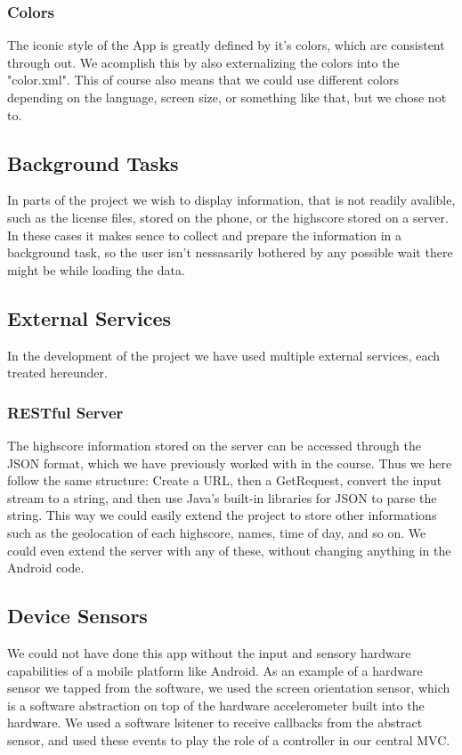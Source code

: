 \documentclass[a4paper, 12pt]{article}
\begin{document}
\subsubsection{Colors}
The iconic style of the App is greatly defined by it's colors, which are consistent through out. We acomplish this by also externalizing the colors into the "color.xml". This of course also means that we could use different colors depending on the language, screen size, or something like that, but we chose not to.

\subsection{Background Tasks}
In parts of the project we wish to display information, that is not
readily avalible, such as the license files, stored on the phone, or
the highscore stored on a server. In these cases it makes sence to
collect and prepare the information in a background task, so the user
isn't nessasarily bothered by any possible wait there might be while
loading the data.

\subsection{External Services}
In the development of the project we have used multiple external
services, each treated hereunder.

\subsubsection{RESTful Server}
The highscore information stored on the server can be accessed through
the JSON format, which we have previously worked with in the
course. Thus we here follow the same structure: Create a URL, then a
GetRequest, convert the input stream to a string, and then use Java's
built-in libraries for JSON to parse the string. This way we could
easily extend the project to store other informations such as the
geolocation of each highscore, names, time of day, and so on. We could
even extend the server with any of these, without changing anything in
the Android code.


\subsection{Device Sensors}
We could not have done this app without the input and sensory hardware
capabilities of a mobile platform like Android. As an example of a
hardware sensor we tapped from the software, we used the screen
orientation sensor, which is a software abstraction on top of the
hardware accelerometer built into the hardware. We used a software
lsitener to receive callbacks from the abstract sensor, and used these
events to play the role of a controller in our central MVC.
\end{document}
